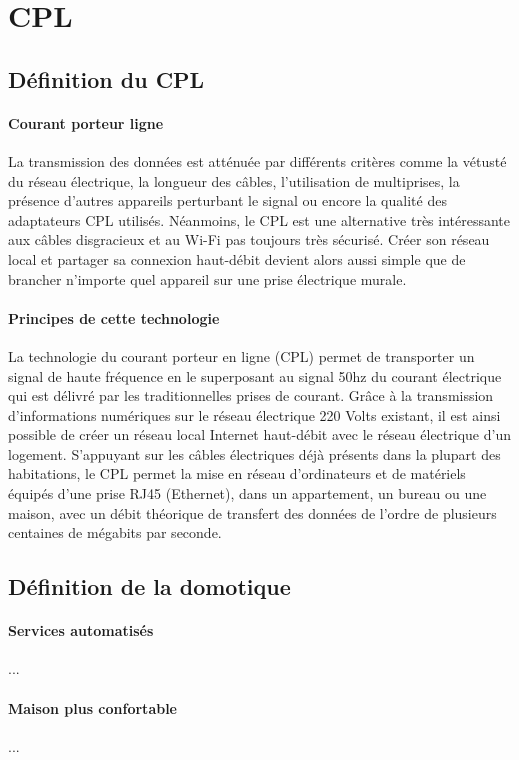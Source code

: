     \section{CPL}
        \subsection{Définition du CPL}
            \paragraph{Courant porteur ligne}
La transmission des données est atténuée par différents critères comme la vétusté du réseau électrique, la longueur des câbles, l'utilisation de multiprises, la présence d'autres appareils perturbant le signal ou encore la qualité des adaptateurs CPL utilisés.
Néanmoins, le CPL est une alternative très intéressante aux câbles disgracieux et au Wi-Fi pas toujours très sécurisé.
Créer son réseau local et partager sa connexion haut-débit devient alors aussi simple que de brancher n'importe quel appareil sur une prise électrique murale.
            \paragraph{Principes de cette technologie}
La technologie du courant porteur en ligne (CPL) permet de transporter un signal de haute fréquence en le superposant au signal 50hz du courant électrique qui est délivré par les traditionnelles prises de courant.
Grâce à la transmission d'informations numériques sur le réseau électrique 220 Volts existant, il est ainsi possible de créer un réseau local Internet haut-débit avec le réseau électrique d'un logement.
S'appuyant sur les câbles électriques déjà présents dans la plupart des habitations, le CPL permet la mise en réseau d'ordinateurs et de matériels équipés d'une prise RJ45 (Ethernet), dans un appartement, un bureau ou une maison, avec un débit théorique de transfert des données de l'ordre de plusieurs centaines de mégabits par seconde.
        \subsection{Définition de la domotique}
            \paragraph{Services automatisés}
                ...
            \paragraph{Maison plus confortable}
                ...
